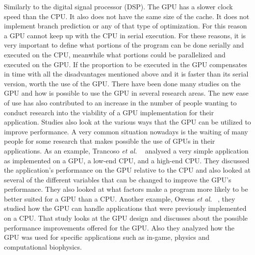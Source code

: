 \documentclass[Ingles]{ic-tese-v1}
\newcommand{\etal}{{\em et al. }}
\begin{document}
Similarly to the digital signal processor (DSP). The GPU has a slower clock speed than the CPU. It also does not have the same size of the cache. It does not implement branch prediction or any of that type of optimization. For this reason a GPU cannot keep up with the CPU in serial execution. 
For these reasons, it is very important to define what portions of the program can be done serially and executed on the CPU, meanwhile what portions could be parallelized and executed on the GPU. If the proportion to be executed in the GPU compensates in time with all the disadvantages mentioned above and it is faster than its serial version, worth the use of the GPU.
There have been done many studies on the GPU and how is possible to use the GPU in several research areas. The new ease of use has also contributed to an increase in the number of people wanting to conduct research into the viability of a GPU implementation for their application. Studies also look at the various ways that the GPU can be utilized to improve performance. A very common situation nowadays is the waiting of many people for some research that makes possible the use of GPUs in their applications.
As an example, Trancoso \etal~\cite{Trancoso2005} analysed a very simple application as implemented on a GPU, a low-end CPU, and a high-end CPU. They discussed the application’s performance on the GPU relative to the CPU and also looked at several of the different variables that can be changed to improve the GPU’s performance. They also looked at what factors make a program more likely to be better suited for a GPU than a CPU.
Another example, Owens \etal~\cite{Owens2008}, they studied how the GPU can handle applications that were previously implemented on a CPU. That study looks at the GPU design and discusses about the possible performance improvements offered for the GPU. Also they analyzed how the GPU was used for specific applications such as in-game, physics and computational biophysics.
\end{document}
